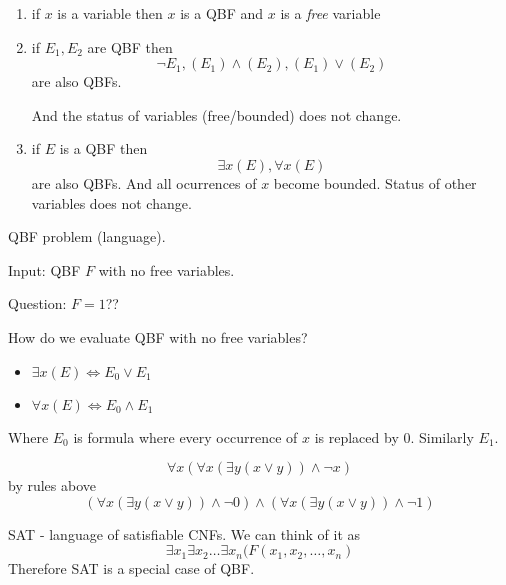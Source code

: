 \begin{definition}
	\begin{enumerate}
		\item if $x$ is a variable then $x$ is a QBF and $x$ is a \emph{free} variable
		\item if $E_1, E_2$ are QBF then
			\[ \neg E_1, (E_1) \land (E_2), (E_1) \lor (E_2) \]
			are also QBFs.

			And the status of variables (free/bounded) does not change.
		\item if $E$ is a QBF then
			\[ \exists x (E), \forall x (E) \]
			are also QBFs. And all ocurrences of $x$ become bounded.
			Status of other variables does not change.
	\end{enumerate}
\end{definition}

\begin{definition}
	QBF problem (language).

	Input: QBF $F$ with no free variables.

	Question: $F = 1$??
\end{definition}

How do we evaluate QBF with no free variables?
\begin{itemize}
	\item $ \exists x (E) \iff E_0 \lor E_1$
	\item $ \forall x (E) \iff E_0 \land E_1$
\end{itemize}
Where $E_0$ is formula where every occurrence of $x$ is replaced by $0$.
Similarly $E_1$.

\begin{example}
	\[ \forall x (\forall x (\exists y (x \lor y)) \land \neg x) \]
	by rules above
	\[ (\forall x (\exists y (x \lor y)) \land \neg 0) \land (\forall x (\exists y (x \lor y)) \land \neg 1) \]
\end{example}

\begin{note}
	SAT - language of satisfiable CNFs.
	We can think of it as
	\[ \exists x_1 \exists x_2 \ldots \exists x_n (F(x_1, x_2, \ldots, x_n) \]
	Therefore SAT is a special case of QBF.
\end{note}

